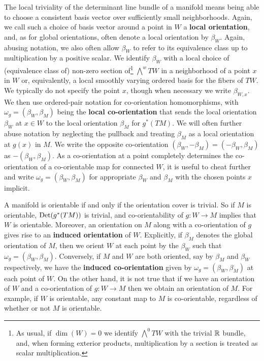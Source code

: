 The local triviality of the determinant line bundle of a manifold means being able to choose a consistent basis vector over sufficiently small neighborhoods.
Again, we call such a choice of basis vector around a point in $W$ a \textbf{local orientation}, and, as for global orientations, often denote a local orientation by $\beta_W$.
Again, abusing notation, we also often allow $\beta_W$ to refer to its equivalence class up to multiplication by a positive scalar.
We identify $\beta_W$ with a local choice of (equivalence class of) non-zero section of\footnote{As usual, if $\dim(W) = 0$ we identify $\bigwedge^0 TW$ with the trivial $\mathbb{R}$ bundle, and, when forming exterior products, multiplication by a section is treated as scalar multiplication.} $\bigwedge^w TW$ in a neighborhood of a point $x$ in $W$ or, equivalently, a local smoothly varying ordered basis for the fibers of $TW$.
We typically do not specify the point $x$, though when necessary we write $\beta_{W,x}$.
We then use ordered-pair notation for co-orientation homomorphisms, with $\omega_g = (\beta_W, \beta_M)$ being the \textbf{local co-orientation} that sends the local orientation $\beta_W$ at $x \in W$ to the local orientation $\beta_M$ for $g^*(TM)$.
We will often further abuse notation by neglecting the pullback and treating $\beta_M$ as a local orientation at $g(x)$ in $M$.
We write the opposite co-orientation $(\beta_W,-\beta_M) = (-\beta_W,\beta_M)$ as $-(\beta_W,\beta_M)$.
As a co-orientation at a point completely determines the co-orientation of a co-orientable map for connected $W$, it is useful to cheat further and write $\omega_g = (\beta_W,\beta_M)$ for appropriate $\beta_W$ and $\beta_M$ with the chosen points $x$ implicit.

A manifold is orientable if and only if the orientation cover is trivial.
So if $M$ is orientable, ${\rm Det}(g^*(TM))$ is trivial, and co-orientability of $g \colon W \to M$ implies that $W$ is orientable.
Moreover, an orientation on $M$ along with a co-orientation of $g$ gives rise to an \textbf{induced orientation} of $W$.
Explicitly, if $\beta_M$ denotes the global orientation of $M$, then we orient $W$ at each point by the $\beta_W$ such that $\omega_g = (\beta_W,\beta_M)$.
Conversely, if $M$ and $W$ are both oriented, say by $\beta_M$ and $\beta_W$ respectively, we have the \textbf{induced co-orientation} given by $\omega_g = (\beta_W,\beta_M)$ at each point of $W$.
On the other hand, it is not true that if we have an orientation of $W$ and a co-orientation of $g \colon W \to M$ then we obtain an orientation of $M$.
For example, if $W$ is orientable, any constant map to $M$ is co-orientable, regardless of whether or not $M$ is orientable.

